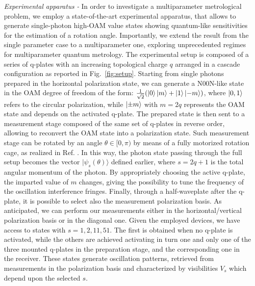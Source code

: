 \documentclass[aps,pra,twocolumn,notitlepage,superscriptaddress]{revtex4-1}
\begin{document}
\emph{Experimental apparatus -}
%
In order to investigate a multiparameter metrological problem, we employ a state-of-the-art experimental apparatus, that allows to generate single-photon high-OAM value states showing quantum-like sensitivities for the estimation of a rotation angle. Importantly, we extend the result from the single parameter case \cite{cimini2021non} to a multiparameter one, exploring unprecedented regimes for multiparameter quantum metrology. The experimental setup is composed of a series of q-plates \cite{marrucci-2006spin-to-orbital,cimini2021non} with an increasing topological charge $q$ arranged in a cascade configuration as reported in Fig.~\ref{fig:setup}. Starting from single photons prepared in the horizontal polarization state, we can generate a N00N-like state in the OAM degree of freedom of the form: $\frac{1}{\sqrt{2}}(\ket{0}\ket{m}+\ket{1}\ket{-m})$, where $\ket{0,1}$ refers to the circular polarization, while $\ket{\pm m}$ with $m=2q$ represents the OAM state and depends on the activated q-plate. The prepared state is then sent to a measurement stage composed of the same set of q-plates in reverse order, allowing to reconvert the OAM state into a polarization state. Such measurement stage can be rotated by an angle $\theta\in[0, \pi)$ by means of a fully motorized rotation cage, as realized in Ref. \cite{cimini2021non}. In this way, the photon state passing through the full setup becomes the vector $|\psi_s(\theta)\rangle$ defined earlier, where $s=2q+1$ is the total angular momentum of the photon. By appropriately choosing the active q-plate, the imparted value of $m$ changes, giving the possibility to tune the frequency of the oscillation interference fringes.
Finally, through a half-waveplate after the q-plate, it is possible to select also the measurement polarization basis. As anticipated, we can perform our measurements either in the horizontal/vertical polarization basis or in the diagonal one. Given the employed devices, we have access to states with $s = 1,2,11,51$. The first is obtained when no q-plate is activated, while the others are achieved activating in turn one and only one of the three mounted q-plates in the preparation stage, and the corresponding one in the receiver. These states generate oscillation patterns, retrieved from measurements in the polarization basis and characterized by visibilities $V_s$ which depend upon the selected $s$.
%
\end{document}
